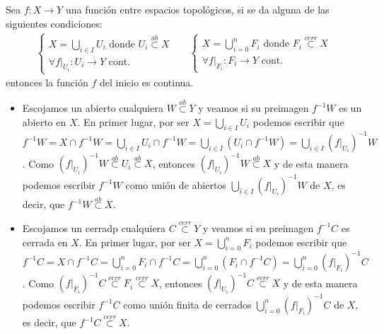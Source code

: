 \begin{prop}
Sea $f: X \rightarrow Y$ una función entre espacios topológicos, si se da alguna de las siguientes condiciones: 
\begin{align*}
\begin{cases}
X = \bigcup_{i \in  I} U_i \mbox{ donde } U_i \stackrel{ab}{\subset} X \\
\forall f|_{U_i} : U_i \rightarrow Y \mbox{ cont.}
\end{cases}
& &
\begin{cases}
X = \bigcup_{i =0}^n F_i \mbox{ donde } F_i \stackrel{cerr}{\subset} X \\
\forall f|_{F_i} : F_i \rightarrow Y \mbox{ cont.}
\end{cases}
\end{align*}
entonces la función $f$ del inicio es continua.
\end{prop}
\begin{demo}
	\begin{itemize}
	\item Escojamos un abierto cualquiera $W \stackrel{ab}{\subset} Y$ y veamos si su preimagen $f^{-1}W$ es un abierto en $X$. En primer lugar, por ser $X = \bigcup_{i \in  I} U_i$ podemos escribir que $f^{-1}W = X\cap f^{-1}W = \bigcup_{i \in  I} U_i \cap f^{-1} W = \bigcup_{i \in  I} \left( U_i \cap f^{-1} W\right) = \bigcup_{i \in  I} \left( f|_{U_i} \right)^{-1} W$. Como $\left( f|_{U_i} \right)^{-1}W \stackrel{ab}{\subset} U_i \stackrel{ab}{\subset} X$, entonces $\left( f|_{U_i} \right)^{-1} W \stackrel{ab}{\subset} X$ y de esta manera podemos escribir $f^{-1}W$ como unión de abiertos $\bigcup_{i \in  I} \left( f|_{U_i} \right)^{-1} W$ de $X$, es decir, que $f^{-1}W \stackrel{ab}{\subset} X$.
	
	\item Escojamos un cerradp cualquiera $C \stackrel{cerr}{\subset} Y$ y veamos si su preimagen $f^{-1}C$ es cerrada en $X$. En primer lugar, por ser $X = \bigcup_{i=0}^n F_i$ podemos escribir que $f^{-1}C = X\cap f^{-1}C = \bigcup_{i = 0}^n F_i \cap f^{-1} C = \bigcup_{i = 0}^n \left( F_i \cap f^{-1} C\right) = \bigcup_{i = 0}^n \left( f|_{F_i} \right)^{-1} C$. Como $\left( f|_{F_i} \right)^{-1}C \stackrel{cerr}{\subset} F_i \stackrel{cerr}{\subset} X$, entonces $\left( f|_{U_i} \right)^{-1} C \stackrel{cerr}{\subset} X$ y de esta manera podemos escribir $f^{-1}C$ como unión finita de cerrados $\bigcup_{i = 0}^n \left( f|_{F_i} \right)^{-1} C$ de $X$, es decir, que $f^{-1}C \stackrel{cerr}{\subset} X$.
    \end{itemize}
\end{demo}


